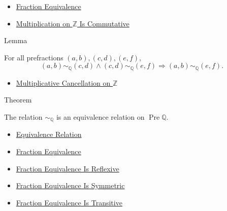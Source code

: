 \begin{dependencies}
\begin{itemize}
  \item \hyperref[def:fraction-equivalence]{Fraction Equivalence}
  \item \hyperref[thm:multiplication-on-z-commutative]{Multiplication on $\mathbb{Z}$ Is Commutative}
\end{itemize}
\end{dependencies}

\begin{lemmabox}{Lemma}
\begin{lemma}
\label{lem:fraction-equivalence-transitive}
For all prefractions $(a,b),(c,d),(e,f)$,
\[
(a,b)\sim_{\mathbb{Q}}(c,d)\land
(c,d)\sim_{\mathbb{Q}}(e,f)
\Longrightarrow
(a,b)\sim_{\mathbb{Q}}(e,f).
\]
\end{lemma}
\end{lemmabox}

\begin{dependencies}
\begin{itemize}
  \item \hyperref[cor:multiplicative-cancellation-on-z]{Multiplicative Cancellation on $\mathbb{Z}$}
\end{itemize}
\end{dependencies}

\begin{theorembox}{Theorem}
\begin{theorem}
\label{thm:fraction-equivalence-relation}
The relation $\sim_{\mathbb{Q}}$ is an equivalence relation on
$\operatorname{Pre}\mathbb{Q}$.
\end{theorem}
\end{theorembox}

\begin{dependencies}
\begin{itemize}
  \item \hyperref[def:equivalence-relation]{Equivalence Relation}
  \item \hyperref[def:fraction-equivalence]{Fraction Equivalence}
  \item \hyperref[lem:fraction-equivalence-reflexive]{Fraction Equivalence Is Reflexive}
  \item \hyperref[lem:fraction-equivalence-symmetric]{Fraction Equivalence Is Symmetric}
  \item \hyperref[lem:fraction-equivalence-transitive]{Fraction Equivalence Is Transitive}
\end{itemize}
\end{dependencies}

